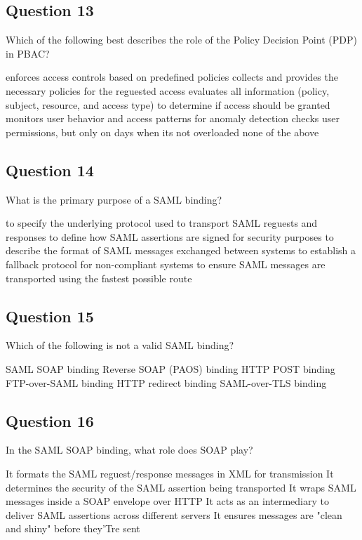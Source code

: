 \subsection*{Question 13}
Which of the following best describes the role of the Policy Decision
Point (PDP) in PBAC?
\begin{itemize}
  \incorrect enforces access controls based on predefined policies
  \incorrect collects and provides the necessary policies for the reguested access
  \correct evaluates all information (policy, subject, resource, and access type) to determine if access should be granted
  \incorrect monitors user behavior and access patterns for anomaly detection
  \incorrect checks user permissions, but only on days when its not overloaded
  \incorrect none of the above
\end{itemize}

\subsection*{Question 14}
What is the primary purpose of a SAML binding?
\begin{itemize}
  \correct to specify the underlying protocol used to transport SAML
  reguests and responses
  \incorrect to define how SAML assertions are signed for security purposes
  \incorrect to describe the format of SAML messages exchanged between
  systems
  \incorrect to establish a fallback protocol for non-compliant systems
  \incorrect to ensure SAML messages are transported using the fastest
  possible route
\end{itemize}

\subsection*{Question 15}
Which of the following is not a valid SAML binding?
\begin{itemize}
  \incorrect  SAML SOAP binding
  \incorrect Reverse SOAP (PAOS) binding
  \incorrect  HTTP POST binding
  \correct FTP-over-SAML binding
  \incorrect  HTTP redirect binding
  \correct  SAML-over-TLS binding
\end{itemize}

\subsection*{Question 16}
In the SAML SOAP binding, what role does SOAP play?
\begin{itemize}
  \incorrect  It formats the SAML reguest/response messages in XML for
  transmission
  \incorrect  It determines the security of the SAML assertion being
  transported
  \correct  It wraps SAML messages inside a SOAP envelope over HTTP
  \incorrect  It acts as an intermediary to deliver SAML assertions
  across different servers
  \incorrect  It ensures messages are "clean and shiny" before they'Tre
  sent
\end{itemize}
